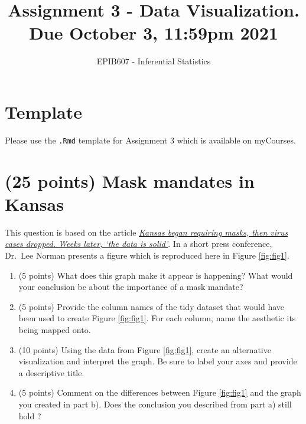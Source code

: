 \documentclass[letterpaper,12pt,twoside,]{pinp}
\title{Assignment 3 - Data Visualization. Due October 3, 11:59pm 2021}
\author[a]{EPIB607 - Inferential Statistics}
\affil[a]{Fall 2021, McGill University}
\providecommand{\tightlist}{%
  \setlength{\itemsep}{0pt}\setlength{\parskip}{0pt}}
\begin{document}
\verticaladjustment{-2pt}

\maketitle
\thispagestyle{firststyle}



\hypertarget{template}{%
\section*{Template}\label{template}}

Please use the \texttt{.Rmd} template for Assignment 3 which is
available on myCourses.

\hypertarget{points-mask-mandates-in-kansas}{%
\section{(25 points) Mask mandates in
Kansas}\label{points-mask-mandates-in-kansas}}

This question is based on the article
\href{https://www.kansas.com/news/politics-government/article244959870.html}{\emph{Kansas
began requiring masks, then virus cases dropped. Weeks later, `the data
is solid'}}. In a short press conference, Dr.~Lee Norman presents a
figure which is reproduced here in Figure \ref{fig:fig1}.

\begin{enumerate}
\def\labelenumi{\alph{enumi})}
\tightlist
\item
  (5 points) What does this graph make it appear is happening? What
  would your conclusion be about the importance of a mask mandate?\\
\item
  (5 points) Provide the column names of the tidy dataset that would
  have been used to create Figure \ref{fig:fig1}. For each column, name
  the aesthetic its being mapped onto.\\
\item
  (10 points) Using the data from Figure \ref{fig:fig1}, create an
  alternative visualization and interpret the graph. Be sure to label
  your axes and provide a descriptive title.\\
\item
  (5 points) Comment on the differences between Figure \ref{fig:fig1}
  and the graph you created in part b). Does the conclusion you
  described from part a) still hold ?
\end{enumerate}
\end{document}
